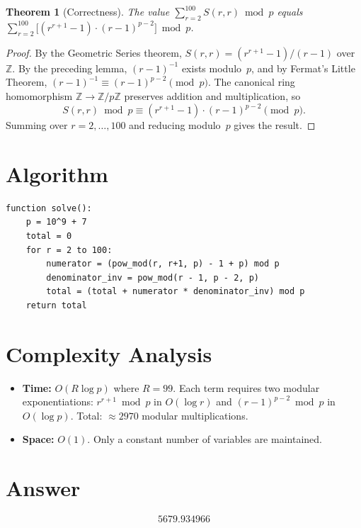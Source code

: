 \documentclass[11pt]{article}
\newtheorem{theorem}{Theorem}
\begin{document}
\begin{theorem}[Correctness]
The value $\sum_{r=2}^{100} S(r, r) \bmod p$ equals $\sum_{r=2}^{100} \bigl[(r^{r+1} - 1) \cdot (r-1)^{p-2}\bigr] \bmod p$.
\end{theorem}

\begin{proof}
By the Geometric Series theorem, $S(r, r) = (r^{r+1} - 1)/(r - 1)$ over~$\mathbb{Z}$. By the preceding lemma, $(r-1)^{-1}$ exists modulo~$p$, and by Fermat's Little Theorem, $(r-1)^{-1} \equiv (r-1)^{p-2} \pmod{p}$. The canonical ring homomorphism $\mathbb{Z} \to \mathbb{Z}/p\mathbb{Z}$ preserves addition and multiplication, so
\[
S(r, r) \bmod p \equiv (r^{r+1} - 1) \cdot (r-1)^{p-2} \pmod{p}.
\]
Summing over $r = 2, \ldots, 100$ and reducing modulo~$p$ gives the result.
\end{proof}

\section{Algorithm}

\begin{verbatim}
function solve():
    p = 10^9 + 7
    total = 0
    for r = 2 to 100:
        numerator = (pow_mod(r, r+1, p) - 1 + p) mod p
        denominator_inv = pow_mod(r - 1, p - 2, p)
        total = (total + numerator * denominator_inv) mod p
    return total
\end{verbatim}

\section{Complexity Analysis}

\begin{itemize}
\item \textbf{Time:} $O(R \log p)$ where $R = 99$. Each term requires two modular exponentiations: $r^{r+1} \bmod p$ in $O(\log r)$ and $(r-1)^{p-2} \bmod p$ in $O(\log p)$. Total: $\approx 2970$ modular multiplications.
\item \textbf{Space:} $O(1)$. Only a constant number of variables are maintained.
\end{itemize}

\section{Answer}

\[
\boxed{5679.934966}
\]
\end{document}
